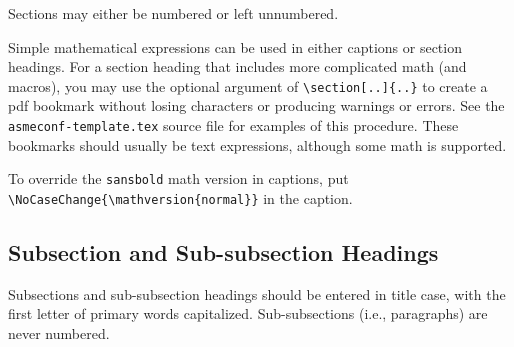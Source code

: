 \documentclass[balance,upint,subscriptcorrection,varvw,mathalfa=cal=boondoxo,spanish,french,vietnamese,russian,greek,pdf-a,fontspec,colorlinks]{asmeconf}
\begin{document}
Sections may either be numbered or left unnumbered.

Simple mathematical expressions can be used in either captions or section headings. For a section heading that includes more complicated math (and macros), you may use the optional argument of \verb|\section[..]{..}| to create a pdf bookmark without losing characters or producing warnings or errors. See the \texttt{asmeconf-template.tex} source file for examples of this procedure. These bookmarks should usually be text expressions, although some math is supported.  

To override the \texttt{sansbold} math version in captions, put \verb|\NoCaseChange{\mathversion{normal}}| in the caption.

\subsection{Subsection and Sub-subsection Headings}

Subsections and sub-subsection headings should be entered in title case, with the first letter of primary words capitalized. Sub-subsections (i.e., paragraphs) are never numbered.




\begin{table}[t]
\caption[Table]{A simple table\label{tab:1}}
\end{table}


\end{document}
